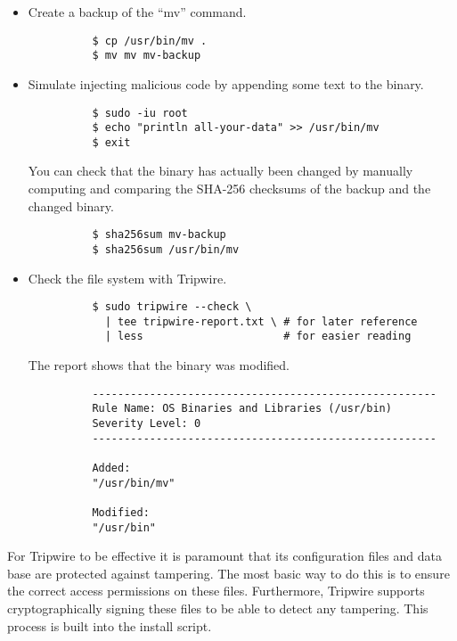 \begin{itemize}
  \item Create a backup of the \enquote{mv} command.

        \begin{verbatim}
          $ cp /usr/bin/mv .
          $ mv mv mv-backup
        \end{verbatim}

  \item Simulate injecting malicious code by appending some text to the binary.

        \begin{verbatim}
          $ sudo -iu root
          $ echo "println all-your-data" >> /usr/bin/mv
          $ exit
        \end{verbatim}

        You can check that the binary has actually been changed by manually computing and comparing the SHA-256 checksums of the backup and the changed binary.

        \begin{verbatim}
          $ sha256sum mv-backup
          $ sha256sum /usr/bin/mv
        \end{verbatim}

  \item Check the file system with Tripwire.

        \begin{verbatim}
          $ sudo tripwire --check \
            | tee tripwire-report.txt \ # for later reference
            | less                      # for easier reading
        \end{verbatim}

        The report shows that the binary was modified.

        \begin{verbatim}
          ------------------------------------------------------
          Rule Name: OS Binaries and Libraries (/usr/bin)
          Severity Level: 0
          ------------------------------------------------------

          Added:
          "/usr/bin/mv"

          Modified:
          "/usr/bin"
        \end{verbatim}

\end{itemize}

For Tripwire to be effective it is paramount that its configuration files and data base are protected against tampering.
The most basic way to do this is to ensure the correct access permissions on these files.
Furthermore, Tripwire supports cryptographically signing these files to be able to detect any tampering.
This process is built into the install script.

